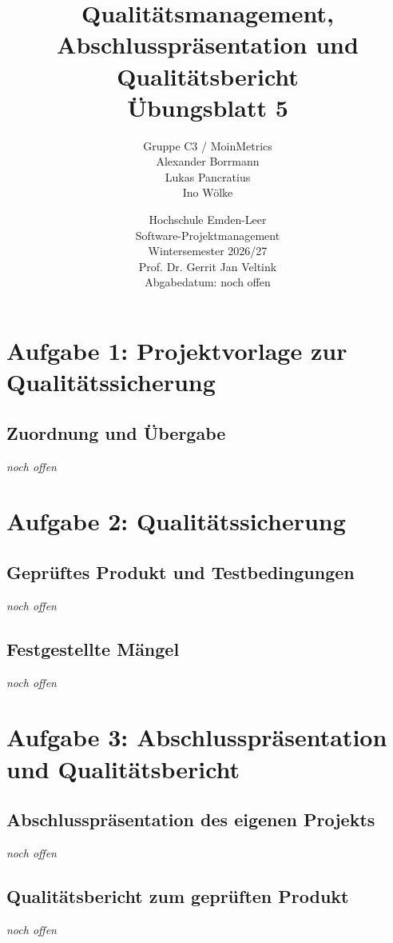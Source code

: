 \documentclass[a4paper,10pt]{article}
\title{Qualitätsmanagement, Abschlusspräsentation und Qualitätsbericht\\{\large Übungsblatt 5}}
\author{Gruppe C3 / MoinMetrics\\{}Alexander Borrmann\\{}Lukas Pancratius\\{}Ino Wölke}
\date{Hochschule Emden-Leer\\Software-Projektmanagement\\Wintersemester 2026/27\\Prof. Dr. Gerrit Jan Veltink\\[1em]Abgabedatum: noch offen}
\newcommand{\offen}{\emph{noch offen}}
\begin{document}
\maketitle
\thispagestyle{fancy}
\clearpage
\section*{Aufgabe 1: Projektvorlage zur Qualitätssicherung}
\subsection*{Zuordnung und Übergabe}
\offen

\section*{Aufgabe 2: Qualitätssicherung}
\subsection*{Geprüftes Produkt und Testbedingungen}
\offen

\subsection*{Festgestellte Mängel}
\offen

\section*{Aufgabe 3: Abschlusspräsentation und Qualitätsbericht}
\subsection*{Abschlusspräsentation des eigenen Projekts}
\offen

\subsection*{Qualitätsbericht zum geprüften Produkt}
\offen
\end{document}
